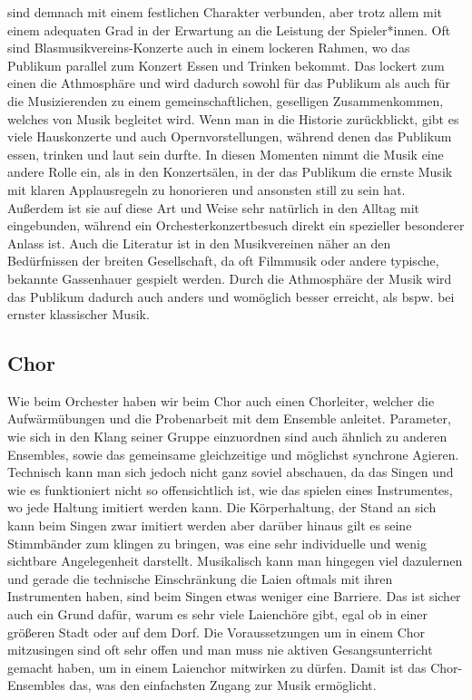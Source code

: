 sind demnach mit einem festlichen Charakter verbunden, aber trotz allem mit
einem adequaten Grad in der Erwartung an die Leistung der Spieler*innen. Oft
sind Blasmusikvereins-Konzerte auch in einem lockeren Rahmen, wo das Publikum
parallel zum Konzert Essen und Trinken bekommt. Das lockert zum einen die
Athmosphäre und wird dadurch sowohl für das Publikum als auch für die
Musizierenden zu einem gemeinschaftlichen, geselligen Zusammenkommen, welches
von Musik begleitet wird. Wenn man in die Historie zurückblickt, gibt es viele
Hauskonzerte und auch Opernvorstellungen, während denen das Publikum essen,
trinken und laut sein durfte. In diesen Momenten nimmt die Musik eine andere
Rolle ein, als in den Konzertsälen, in der das Publikum die ernste Musik mit
klaren Applausregeln zu honorieren und ansonsten still zu sein hat. Außerdem ist
sie auf diese Art und Weise sehr natürlich in den Alltag mit eingebunden,
während ein Orchesterkonzertbesuch direkt ein spezieller besonderer Anlass ist.
Auch die Literatur ist in den Musikvereinen näher an den Bedürfnissen der
breiten Gesellschaft, da oft Filmmusik oder andere typische, bekannte
Gassenhauer gespielt werden. Durch die Athmosphäre der Musik wird das Publikum
dadurch auch anders und womöglich besser erreicht, als bspw. bei ernster
klassischer Musik. 


\subsection{Chor}
Wie beim Orchester haben wir beim Chor auch einen Chorleiter, welcher die
Aufwärmübungen und die Probenarbeit mit dem Ensemble anleitet. Parameter, wie
sich in den Klang seiner Gruppe einzuordnen sind auch ähnlich zu anderen
Ensembles, sowie das gemeinsame gleichzeitige und möglichst synchrone Agieren.
Technisch kann man sich jedoch nicht ganz soviel abschauen, da das Singen und
wie es funktioniert nicht so offensichtlich ist, wie das spielen eines
Instrumentes, wo jede Haltung imitiert werden kann. Die Körperhaltung, der Stand
an sich kann beim Singen zwar imitiert werden aber darüber hinaus gilt es seine
Stimmbänder zum klingen zu bringen, was eine sehr individuelle und wenig
sichtbare Angelegenheit darstellt. Musikalisch kann man hingegen viel dazulernen
und gerade die technische Einschränkung die Laien oftmals mit ihren Instrumenten
haben, sind beim Singen etwas weniger eine Barriere. Das ist sicher auch ein
Grund dafür, warum es sehr viele Laienchöre gibt, egal ob in einer größeren
Stadt oder auf dem Dorf. Die Voraussetzungen um in einem Chor mitzusingen sind
oft sehr offen und man muss nie aktiven Gesangsunterricht gemacht haben, um in
einem Laienchor mitwirken zu dürfen. Damit ist das Chor-Ensembles das, was den
einfachsten Zugang zur Musik ermöglicht. 


